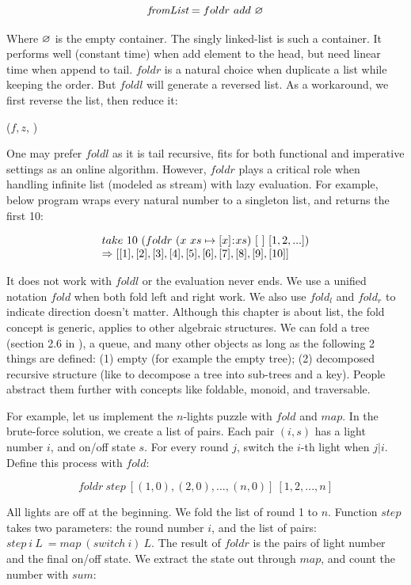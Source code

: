 \documentclass[b5paper]{article}
\begin{document}
\[
\textit{fromList} = foldr\ add\ \nil
\]

Where $\varnothing$ is the empty container. The singly linked-list is such a container. It performs well (constant time) when add element to the head, but need linear time when append to tail. $foldr$ is a natural choice when duplicate a list while keeping the order. But $foldl$ will generate a reversed list. As a workaround, we first reverse the list, then reduce it:

\begin{algorithmic}[1]
  \State \Return {}($f, z$, )
\EndFunction
\end{algorithmic}

One may prefer $foldl$ as it is tail recursive, fits for both functional and imperative settings as an online algorithm. However, $foldr$ plays a critical role when handling infinite list (modeled as stream) with lazy evaluation. For example, below program wraps every natural number to a singleton list, and returns the first 10:

\[
\begin{array}{l}
take\ 10\ (foldr\ (x\ xs \mapsto [x] \mathbin{\!:\!} xs)\ [\ ]\ [1, 2, ...]) \\
\Rightarrow [[1], [2], [3], [4], [5], [6], [7], [8], [9], [10]]
\end{array}
\]

It does not work with $foldl$ or the evaluation never ends. We use a unified notation $fold$ when both fold left and right work. We also use $fold_l$ and $fold_r$ to indicate direction doesn't matter. Although this chapter is about list, the fold concept is generic, applies to other algebraic structures. We can fold a tree (section 2.6 in \cite{unplugged}), a queue, and many other objects as long as the following 2 things are defined: (1) empty (for example the empty tree); (2) decomposed recursive structure (like to decompose a tree into sub-trees and a key). People abstract them further with concepts like foldable, monoid, and traversable.

For example, let us implement the $n$-lights puzzle with $fold$ and $map$. In the brute-force solution, we create a list of pairs. Each pair $(i, s)$ has a light number $i$, and on/off state $s$. For every round $j$, switch the $i$-th light when $j | i$. Define this process with $fold$:

\[
foldr\ step\ [(1, 0), (2, 0), ..., (n, 0)]\ [1, 2, ..., n]
\]

All lights are off at the beginning. We fold the list of round 1 to $n$. Function $step$ takes two parameters: the round number $i$, and the list of pairs: $step\ i\ L\ = map\ (switch\ i)\ L$. The result of $foldr$ is the pairs of light number and the final on/off state. We extract the state out through $map$, and count the number with $sum$:
\end{document}
